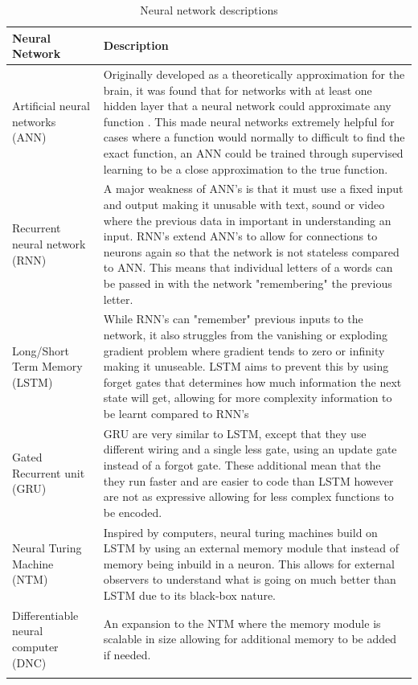 \begin{longtable}{|p{3.5cm}|p{11cm}|} \hline
    \textbf{Neural Network} & \textbf{Description} \\ \hline
    Artificial neural networks (ANN) \cite{ANN} & Originally developed as a theoretically approximation for the brain, it was found that for networks
    with at least one hidden layer that a neural network could approximate any function \citep{csaji2001approximation}. This made neural networks extremely
    helpful for cases where a function would normally to difficult to find the exact function, an ANN could be trained through supervised learning to
    be a close approximation to the true function. \\ \hline

    Recurrent neural network (RNN) \cite{RNN} & A major weakness of ANN's is that it must use a fixed input and output making it unusable with text, sound or video
    where the previous data in important in understanding an input. RNN's extend ANN's to allow for connections to neurons again so that the network
    is not stateless compared to ANN. This means that individual letters of a words can be passed in with the network "remembering" the previous letter. \\ \hline

    Long/Short Term Memory (LSTM) \cite{LSTM} & While RNN's can "remember" previous inputs to the network, it also struggles from the vanishing or exploding
    gradient problem where gradient tends to zero or infinity making it unuseable. LSTM aims to prevent this by using forget gates that determines how much information
    the next state will get, allowing for more complexity information to be learnt compared to RNN's\\ \hline

    Gated Recurrent unit (GRU) \cite{GRU} & GRU are very similar to LSTM, except that they use different wiring and a single less gate, using an update gate
    instead of a forgot gate. These additional mean that the they run faster and are easier to code than LSTM however are not as expressive allowing for
    less complex functions to be encoded. \\ \hline

    Neural Turing Machine (NTM) \cite{NTM} & Inspired by computers, neural turing machines build on LSTM by using an external memory module that instead of memory being
    inbuild in a neuron. This allows for external observers to understand what is going on much better than LSTM due to its black-box nature. \\ \hline

    Differentiable neural computer (DNC) \cite{DNC} & An expansion to the NTM where the memory module is scalable in size allowing for additional
    memory to be added if needed. \\ \hline

    \caption{Neural network descriptions}
    \label{tab:neural_network_description}
\end{longtable}

